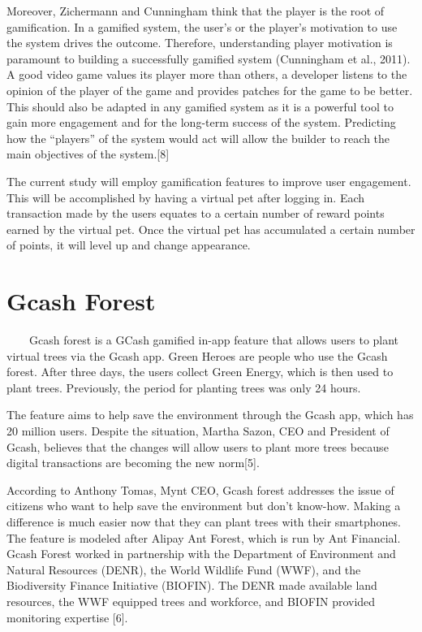 Moreover, Zichermann and Cunningham think that the player is the root of gamification. In a gamified system, the user’s or the player’s motivation to use the system drives the outcome. Therefore, understanding player motivation is paramount to building a successfully gamified system (Cunningham et al., 2011). A good video game values its player more than others, a developer listens to the opinion of the player of the game and provides patches for the game to be better. This should also be adapted in any gamified system as it is a powerful tool to gain more engagement and for the long-term success of the system. Predicting how the “players” of the system would act will allow the builder to reach the main objectives of the system.[8]

The current study will employ gamification features to improve user engagement. This will be accomplished by having a virtual pet after logging in. Each transaction made by the users equates to a certain number of reward points earned by the virtual pet. Once the virtual pet has accumulated a certain number of points, it will level up and change appearance. 

\section{Gcash Forest}

~~~~Gcash forest is a GCash gamified in-app feature that allows users to plant virtual trees via the Gcash app. Green Heroes are people who use the Gcash forest. After three days, the users collect Green Energy, which is then used to plant trees. Previously, the period for planting trees was only 24 hours.

The feature aims to help save the environment through the Gcash app, which has 20 million users. Despite the situation, Martha Sazon, CEO and President of Gcash, believes that the changes will allow users to plant more trees because digital transactions are becoming the new norm[5].

According to Anthony Tomas, Mynt CEO, Gcash forest addresses the issue of citizens who want to help save the environment but don't know-how. Making a difference is much easier now that they can plant trees with their smartphones. The feature is modeled after Alipay Ant Forest, which is run by Ant Financial. Gcash Forest worked in partnership with the Department of Environment and Natural Resources (DENR), the World Wildlife Fund (WWF), and the Biodiversity Finance Initiative (BIOFIN). The DENR made available land resources, the WWF equipped trees and workforce, and BIOFIN provided monitoring expertise [6].

